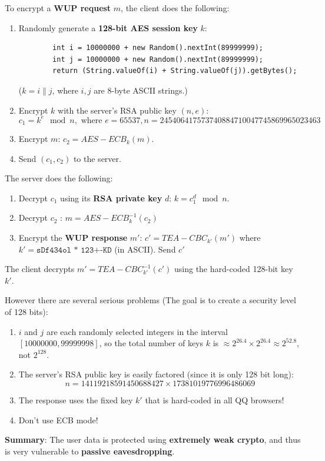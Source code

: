 \documentclass[12pt,titlepage]{article}
\begin{document}
To encrypt a \textbf{WUP request} $m$, the client does the following:\begin{enumerate}
	\item Randomly generate a \textbf{128-bit AES session key} $k$:\begin{verbatim}
		int i = 10000000 + new Random().nextInt(89999999);
		int j = 10000000 + new Random().nextInt(89999999);
		return (String.valueOf(i) + String.valueOf(j)).getBytes();
	\end{verbatim}
	($k = i\|j$, where $i, j$ are 8-byte ASCII strings.)
	\item Encrypt $k$ with the server’s RSA public key $(n, e)$: $$c_1 = k^e \mod n, \text{ where } e = 65537, n=245406417573740884710047745869965023463$$
	\item Encrypt $m$: $c_2 = AES-ECB_k (m)$.
	\item Send $(c_1 , c_2 )$ to the server.
\end{enumerate}
The server does the following:\begin{enumerate}
	\item Decrypt $c_1$ using its \textbf{RSA private key} $d$: $k = c_1^d \mod n$.
	\item Decrypt $c_2$ : $m = AES-ECB^{-1}_k (c_2)$
	\item Encrypt the \textbf{WUP response} $m'$: $c' = TEA-CBC_{k'}(m')$ where $k' = \texttt{sDf434ol * 123+-KD}$ (in ASCII). Send $c'$
\end{enumerate}

The client decrypts $m'= TEA-CBC^{-1}_{k'} (c')$ using the hard-coded 128-bit key $k'$.

However there are several serious problems (The goal is to create a security level of 128 bits): \begin{enumerate}
	\item $i$ and $j$ are each randomly selected integers in the interval $[10000000, 99999998]$, so the total number of keys $k$ is $\approx 2^{26.4} \times 2^{26.4} \approx 2^{52.8}$, not $2^{128}$. 
	\item The server’s RSA public key is easily factored (since it is only 128 bit long):$$n = 14119218591450688427 \times 17381019776996486069$$
	\item The response uses the fixed key $k'$ that is hard-coded in all QQ browsers!
	\item Don’t use ECB mode!
\end{enumerate}

\textbf{Summary}: The user data is protected using \textbf{extremely weak crypto}, and thus is very vulnerable to \textbf{passive eavesdropping}.
\end{document}
